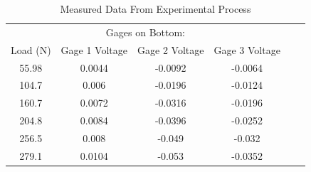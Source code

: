 \documentclass[12pt]{article}
\begin{document}
\begin{table} [h]
\begin{tabular}{ccccrr}
		\multicolumn{4}{c}{Gages on Bottom:} &       &  \\
		Load (N) & Gage 1 Voltage & Gage 2 Voltage & Gage 3 Voltage &       &  \\
		55.98 & 0.0044 & -0.0092 & -0.0064 &       &  \\
		104.7 & 0.006 & -0.0196 & -0.0124 &       &  \\
		160.7 & 0.0072 & -0.0316 & -0.0196 &       &  \\
		204.8 & 0.0084 & -0.0396 & -0.0252 &       &  \\
		256.5 & 0.008 & -0.049 & -0.032 &       &  \\
		279.1 & 0.0104 & -0.053 & -0.0352 &       &  \\
	\end{tabular}%
	\caption{Measured Data From Experimental Process}
	\label{tab:Raw Data}%
\end{table}
\end{document}
